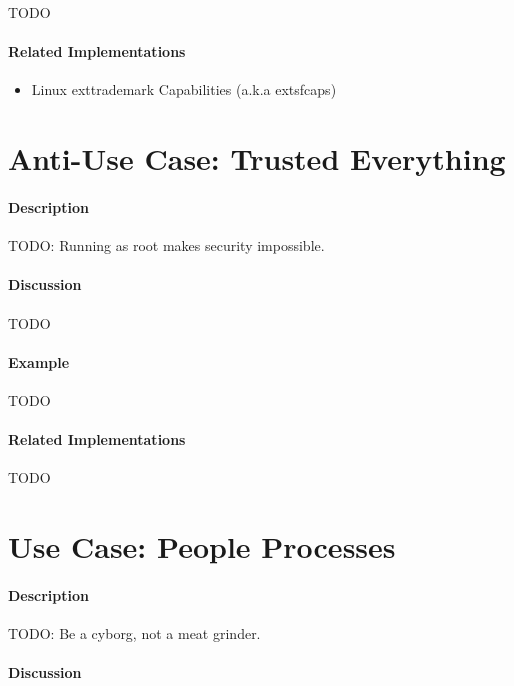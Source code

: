 {\Large TODO}

\paragraph{Related Implementations}

\begin{itemize}
        \item Linux        exttrademark{} Capabilities (a.k.a         extsf{caps})
\end{itemize}

\section{Anti-Use Case: Trusted Everything}

\paragraph{Description}

{\Large TODO:} Running as root makes security impossible.

\paragraph{Discussion}

{\Large TODO}

\paragraph{Example}

{\Large TODO}

\paragraph{Related Implementations}

{\Large TODO}

\section{Use Case: People Processes}

\paragraph{Description}

{\Large TODO:} Be a cyborg, not a meat grinder.

\paragraph{Discussion}


